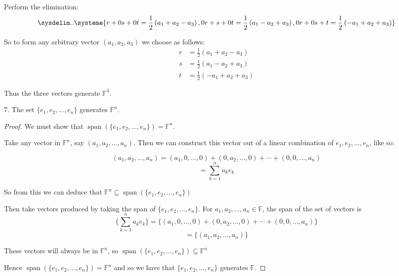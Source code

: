 \documentclass[11pt]{article}
\newcommand{\br}[1]{\left(#1\right)}
\newcommand{\cbr}[1]{\{#1\}}
\DeclareMathOperator{\Span}{span}
\begin{document}
Perform the elimination:
\begin{equation*}
    \sysdelim..\systeme{
        r +0s +0t = \frac{1}{2}\br{a_1+a_2-a_3},
        0r +s +0t = \frac{1}{2}\br{a_1-a_2+a_3},
        0r +0s +t = \frac{1}{2}\br{-a_1+a_2+a_3}
    }
\end{equation*}

So to form any arbitrary vector $\br{a_1,a_2,a_3}$ we choose as follows:
\begin{align*}
    r &= \frac{1}{2}\br{a_1+a_2-a_3}\\
    s &= \frac{1}{2}\br{a_1-a_2+a_3}\\
    t &= \frac{1}{2}\br{-a_1+a_2+a_3}
\end{align*}

Thus the three vectors generate $\mathbb{F}^3$.

7. The set $\cbr{e_1,e_2,\dots,e_n}$ generates $\mathbb{F}^n$.
\begin{proof} We must show that $\Span\br{\cbr{e_1,e_2,\dots,e_n}} = \mathbb{F}^n$. 

Take any vector in $\mathbb{F}^n$, say $\br{a_1,a_2,\dots,a_n}$. Then we can construct this vector out of a linear combination of $e_1,e_2,\dots,e_n$, like so:

$$\br{a_1,a_2,\dots,a_n} = \br{a_1,0,\dots,0} + \br{0,a_2,\dots,0} + \cdots + \br{0,0,\dots,a_n}$$
$$ = \sum_{k=1}^n a_ke_k$$

So from this we can deduce that $\mathbb{F}^n\subseteq \Span\br{\cbr{e_1,e_2,\dots,e_n}}$

Then take vectors produced by taking the span of $\cbr{e_1,e_2,\dots,e_n}$. For $a_1,a_2,\dots,a_n\in \mathbb{F}$, the span of the set of vectors is $$\cbr{\sum_{k=1}^n a_ke_k} = \cbr{\br{a_1,0,\dots,0} + \br{0,a_2,\dots,0} + \cdots + \br{0,0,\dots,a_n}}$$
$$ = \cbr{\br{a_1,a_2,\dots,a_n}}$$

These vectors will always be in $\mathbb{F}^n$, so $\Span\br{\cbr{e_1,e_2,\dots,e_n}} \subseteq \mathbb{F}^n$

Hence $\Span\br{\cbr{e_1,e_2,\dots,e_n}} = \mathbb{F}^n$ and so we have that $\cbr{e_1,e_2,\dots,e_n}$ generates $\mathbb{F}$.
\end{proof}
\end{document}
